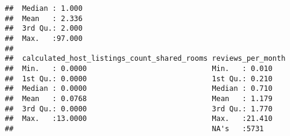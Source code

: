 \begin{verbatim}
##  Median : 1.000                              
##  Mean   : 2.336                              
##  3rd Qu.: 2.000                              
##  Max.   :97.000                              
##                                              
##  calculated_host_listings_count_shared_rooms reviews_per_month
##  Min.   : 0.0000                             Min.   : 0.010   
##  1st Qu.: 0.0000                             1st Qu.: 0.210   
##  Median : 0.0000                             Median : 0.710   
##  Mean   : 0.0768                             Mean   : 1.179   
##  3rd Qu.: 0.0000                             3rd Qu.: 1.770   
##  Max.   :13.0000                             Max.   :21.410   
##                                              NA's   :5731
\end{verbatim}

